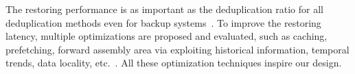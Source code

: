 The restoring performance is as important as the deduplication ratio for all
deduplication methods even for backup systems~\cite{lillibridge2013improving}.
%
To improve the restoring latency, multiple optimizations are proposed and
evaluated, such as caching, prefetching, forward assembly area via exploiting
historical information, temporal trends, data locality,
etc.~\cite{fu2014accelerating,fu2015design,fu2011aa}. 
%
All these optimization
techniques inspire our design.


%
%
%
%
%



